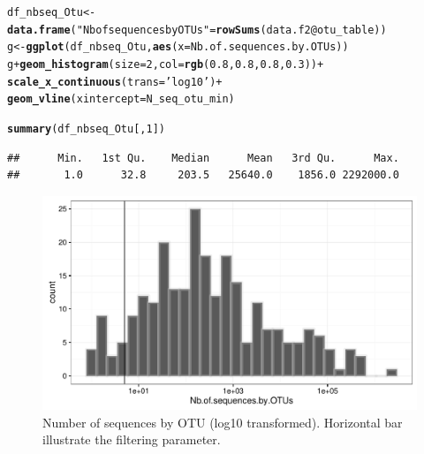 \documentclass[12pt]{article}\usepackage[]{graphicx}\usepackage[]{color}
\makeatletter
\def\maxwidth{ %
  \ifdim\Gin@nat@width>\linewidth
    \linewidth
  \else
    \Gin@nat@width
  \fi
}
\newcommand{\hlnum}[1]{\textcolor[rgb]{0.686,0.059,0.569}{#1}}%
\newcommand{\hlstr}[1]{\textcolor[rgb]{0.192,0.494,0.8}{#1}}%
\newcommand{\hlopt}[1]{\textcolor[rgb]{0,0,0}{#1}}%
\newcommand{\hlstd}[1]{\textcolor[rgb]{0.345,0.345,0.345}{#1}}%
\newcommand{\hlkwb}[1]{\textcolor[rgb]{0.69,0.353,0.396}{#1}}%
\newcommand{\hlkwc}[1]{\textcolor[rgb]{0.333,0.667,0.333}{#1}}%
\newcommand{\hlkwd}[1]{\textcolor[rgb]{0.737,0.353,0.396}{\textbf{#1}}}%
\newenvironment{kframe}{%
 \def\at@end@of@kframe{}%
 \ifinner\ifhmode%
  \def\at@end@of@kframe{\end{minipage}}%
  \begin{minipage}{\columnwidth}%
 \fi\fi%
 \def\FrameCommand##1{\hskip\@totalleftmargin \hskip-\fboxsep
 \colorbox{shadecolor}{##1}\hskip-\fboxsep
     \hskip-\linewidth \hskip-\@totalleftmargin \hskip\columnwidth}%
 \MakeFramed {\advance\hsize-\width
   \@totalleftmargin\z@ \linewidth\hsize
   \@setminipage}}%
 {\par\unskip\endMakeFramed%
 \at@end@of@kframe}
\newenvironment{knitrout}{}{} %
\numberwithin{figure}{section}
\makeatother
\begin{document}
\begin{knitrout}\small
{}\color{fgcolor}\begin{kframe}
\begin{alltt}
\hlstd{df_nbseq_Otu} \hlkwb{<-} \hlkwd{data.frame}\hlstd{(}\hlstr{"Nb of sequences by OTUs"} \hlstd{=} \hlkwd{rowSums}\hlstd{(data.f2}\hlopt{@}\hlkwc{otu_table}\hlstd{))}
\hlstd{g} \hlkwb{<-} \hlkwd{ggplot}\hlstd{(df_nbseq_Otu,} \hlkwd{aes}\hlstd{(}\hlkwc{x} \hlstd{= Nb.of.sequences.by.OTUs))}
\hlstd{g} \hlopt{+} \hlkwd{geom_histogram}\hlstd{(}\hlkwc{size} \hlstd{=} \hlnum{2}\hlstd{,} \hlkwc{col} \hlstd{=} \hlkwd{rgb}\hlstd{(}\hlnum{0.8}\hlstd{,} \hlnum{0.8}\hlstd{,} \hlnum{0.8}\hlstd{,} \hlnum{0.3}\hlstd{))} \hlopt{+}
  \hlkwd{scale_x_continuous}\hlstd{(}\hlkwc{trans} \hlstd{=} \hlstr{'log10'}\hlstd{)} \hlopt{+}
  \hlkwd{geom_vline}\hlstd{(}\hlkwc{xintercept}\hlstd{= N_seq_otu_min)}
\end{alltt}


{\ttfamily\noindent\itshape\color{messagecolor}{\#\# `stat\_bin()` using `bins = 30`. Pick better value with `binwidth`.}}\begin{alltt}
\hlkwd{summary}\hlstd{(df_nbseq_Otu[,} \hlnum{1}\hlstd{])}
\end{alltt}
\begin{verbatim}
##      Min.   1st Qu.    Median      Mean   3rd Qu.      Max. 
##       1.0      32.8     203.5   25640.0    1856.0 2292000.0
\end{verbatim}
\end{kframe}\begin{figure}

{\centering \includegraphics[width=\maxwidth]{figure/nbseq_Otu-1} 

}

\caption[Number of sequences by OTU (log10 transformed)]{Number of sequences by OTU (log10 transformed). Horizontal bar illustrate the filtering parameter.}\label{fig:nbseq_Otu}
\end{figure}


\end{knitrout}
\end{document}
